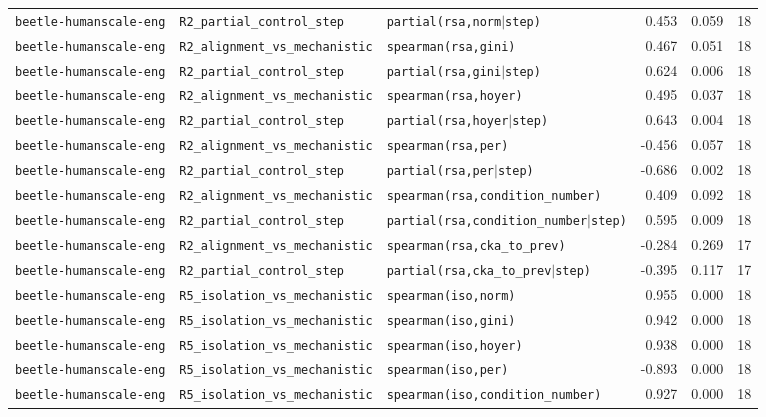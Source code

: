 \begin{longtable}{lllrrr}
\texttt{beetle-humanscale-eng} & \texttt{R2\_partial\_control\_step} & \texttt{partial(rsa,norm$\mid$step)} & 0.453 & 0.059 & 18 \\
\texttt{beetle-humanscale-eng} & \texttt{R2\_alignment\_vs\_mechanistic} & \texttt{spearman(rsa,gini)} & 0.467 & 0.051 & 18 \\
\texttt{beetle-humanscale-eng} & \texttt{R2\_partial\_control\_step} & \texttt{partial(rsa,gini$\mid$step)} & 0.624 & 0.006 & 18 \\
\texttt{beetle-humanscale-eng} & \texttt{R2\_alignment\_vs\_mechanistic} & \texttt{spearman(rsa,hoyer)} & 0.495 & 0.037 & 18 \\
\texttt{beetle-humanscale-eng} & \texttt{R2\_partial\_control\_step} & \texttt{partial(rsa,hoyer$\mid$step)} & 0.643 & 0.004 & 18 \\
\texttt{beetle-humanscale-eng} & \texttt{R2\_alignment\_vs\_mechanistic} & \texttt{spearman(rsa,per)} & -0.456 & 0.057 & 18 \\
\texttt{beetle-humanscale-eng} & \texttt{R2\_partial\_control\_step} & \texttt{partial(rsa,per$\mid$step)} & -0.686 & 0.002 & 18 \\
\texttt{beetle-humanscale-eng} & \texttt{R2\_alignment\_vs\_mechanistic} & \texttt{spearman(rsa,condition\_number)} & 0.409 & 0.092 & 18 \\
\texttt{beetle-humanscale-eng} & \texttt{R2\_partial\_control\_step} & \texttt{partial(rsa,condition\_number$\mid$step)} & 0.595 & 0.009 & 18 \\
\texttt{beetle-humanscale-eng} & \texttt{R2\_alignment\_vs\_mechanistic} & \texttt{spearman(rsa,cka\_to\_prev)} & -0.284 & 0.269 & 17 \\
\texttt{beetle-humanscale-eng} & \texttt{R2\_partial\_control\_step} & \texttt{partial(rsa,cka\_to\_prev$\mid$step)} & -0.395 & 0.117 & 17 \\
\texttt{beetle-humanscale-eng} & \texttt{R5\_isolation\_vs\_mechanistic} & \texttt{spearman(iso,norm)} & 0.955 & 0.000 & 18 \\
\texttt{beetle-humanscale-eng} & \texttt{R5\_isolation\_vs\_mechanistic} & \texttt{spearman(iso,gini)} & 0.942 & 0.000 & 18 \\
\texttt{beetle-humanscale-eng} & \texttt{R5\_isolation\_vs\_mechanistic} & \texttt{spearman(iso,hoyer)} & 0.938 & 0.000 & 18 \\
\texttt{beetle-humanscale-eng} & \texttt{R5\_isolation\_vs\_mechanistic} & \texttt{spearman(iso,per)} & -0.893 & 0.000 & 18 \\
\texttt{beetle-humanscale-eng} & \texttt{R5\_isolation\_vs\_mechanistic} & \texttt{spearman(iso,condition\_number)} & 0.927 & 0.000 & 18 \\

\end{longtable}
